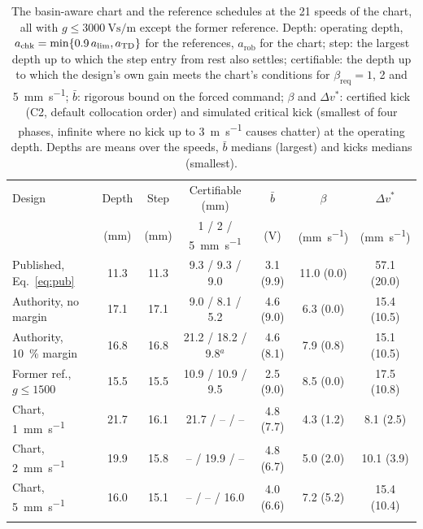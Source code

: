 \begin{table}[!tbp]
  \centering
  \caption{The basin-aware chart and the reference schedules at the 21 speeds of the chart, all with $g\le\SI{3000}{\volt\second\per\metre}$ except the former reference. Depth: operating depth, $a_{\mathrm{chk}}=\min\{0.9\,a_{\lim},a_{\mathrm{TD}}\}$ for the references, $a_{\mathrm{rob}}$ for the chart; step: the largest depth up to which the step entry from rest also settles; certifiable: the depth up to which the design's own gain meets the chart's conditions for $\beta_{\mathrm{req}}=1$, 2 and \SI{5}{\milli\metre\per\second}; $\bar b$: rigorous bound on the forced command; $\beta$ and $\Delta v^*$: certified kick (C2, default collocation order) and simulated critical kick (smallest of four phases, infinite where no kick up to \SI{3}{\metre\per\second} causes chatter) at the operating depth. Depths are means over the speeds, $\bar b$ medians (largest) and kicks medians (smallest).}
  \label{tab:ba}
  \footnotesize
  \setlength{\tabcolsep}{3pt}
  \begin{tabular}{@{}lcccccc@{}}
    \toprule
    Design & Depth & Step & Certifiable (\si{\milli\metre}) & $\bar b$ & $\beta$ & $\Delta v^*$\\
     & (\si{\milli\metre}) & (\si{\milli\metre}) & 1 / 2 / \SI{5}{\milli\metre\per\second} & (\si{\volt}) & (\si{\milli\metre\per\second}) & (\si{\milli\metre\per\second})\\
    \midrule
    Published, Eq.~\eqref{eq:pub} & 11.3 & 11.3 & 9.3 / 9.3 / 9.0 & 3.1 (9.9) & 11.0 (0.0) & 57.1 (20.0)\\
    Authority, no margin & 17.1 & 17.1 & 9.0 / 8.1 / 5.2 & 4.6 (9.0) & 6.3 (0.0) & 15.4 (10.5)\\
    Authority, \SI{10}{\percent} margin & 16.8 & 16.8 & 21.2 / 18.2 / 9.8$^{a}$ & 4.6 (8.1) & 7.9 (0.8) & 15.1 (10.5)\\
    Former ref., $g\le1500$ & 15.5 & 15.5 & 10.9 / 10.9 / 9.5 & 2.5 (9.0) & 8.5 (0.0) & 17.5 (10.8)\\
    \addlinespace
    Chart, \SI{1}{\milli\metre\per\second} & 21.7 & 16.1 & 21.7 / -- / -- & 4.8 (7.7) & 4.3 (1.2) & 8.1 (2.5)\\
    Chart, \SI{2}{\milli\metre\per\second} & 19.9 & 15.8 & -- / 19.9 / -- & 4.8 (6.7) & 5.0 (2.0) & 10.1 (3.9)\\
    Chart, \SI{5}{\milli\metre\per\second} & 16.0 & 15.1 & -- / -- / 16.0 & 4.0 (6.6) & 7.2 (5.2) & 15.4 (10.4)\\
    \addlinespace
    \multicolumn{7}{@{}l}{\emph{With the depth margin $a\le0.9\,\alim$ also in the chart}}\\

\end{tabular}
\end{table}
